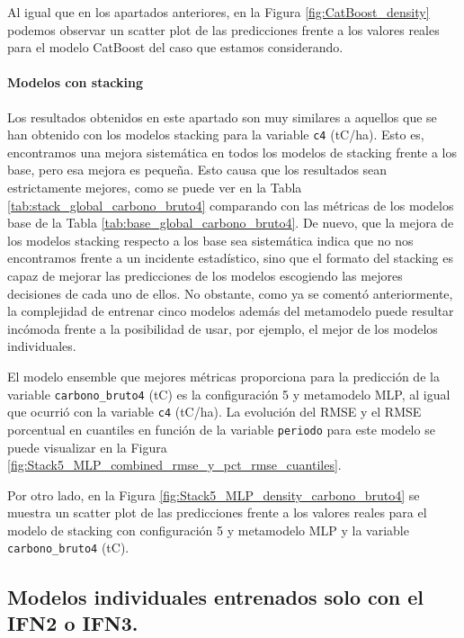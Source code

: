 Al igual que en los apartados anteriores, en la Figura \ref{fig:CatBoost_density} podemos observar un scatter plot de las predicciones frente a los valores reales para el modelo CatBoost del caso que estamos considerando.




\paragraph{Modelos con stacking}

Los resultados obtenidos en este apartado son muy similares a aquellos que se han obtenido con los modelos stacking para la variable \texttt{c4} (tC/ha). Esto es, encontramos una mejora sistemática en todos los modelos de stacking frente a los base, pero esa mejora es pequeña. Esto causa que los resultados sean estrictamente mejores, como se puede ver en la Tabla \ref{tab:stack_global_carbono_bruto4} comparando con las métricas de los modelos base de la Tabla \ref{tab:base_global_carbono_bruto4}. De nuevo, que la mejora de los modelos stacking respecto a los base sea sistemática indica que no nos encontramos frente a un incidente estadístico, sino que el formato del stacking es capaz de mejorar las predicciones de los modelos escogiendo las mejores decisiones de cada uno de ellos. No obstante, como ya se comentó anteriormente, la complejidad de entrenar cinco modelos además del metamodelo puede resultar incómoda frente a la posibilidad de usar, por ejemplo, el mejor de los modelos individuales.

El modelo ensemble que mejores métricas proporciona para la predicción de la variable \texttt{carbono\_bruto4} (tC) es la configuración 5 y metamodelo MLP, al igual que ocurrió con la variable \texttt{c4} (tC/ha). La evolución del RMSE y el RMSE porcentual en cuantiles en función de la variable \texttt{periodo} para este modelo se puede visualizar en la Figura \ref{fig:Stack5_MLP_combined_rmse_y_pct_rmse_cuantiles}.



Por otro lado, en la Figura \ref{fig:Stack5_MLP_density_carbono_bruto4} se muestra un scatter plot de las predicciones frente a los valores reales para el modelo de stacking con configuración 5 y metamodelo MLP y la variable \texttt{carbono\_bruto4} (tC).

\subsection{Modelos individuales entrenados solo con el IFN2 o IFN3.}

